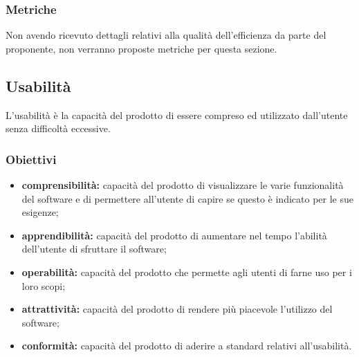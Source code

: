 \subsubsection{Metriche}
Non avendo ricevuto dettagli relativi alla qualità dell'efficienza da parte del proponente, non verranno proposte metriche per questa sezione.

\subsection{Usabilità}
L'usabilità è la capacità del prodotto di essere compreso ed utilizzato dall'utente senza difficoltà eccessive.

\subsubsection{Obiettivi}
\begin{itemize}
	\item \textbf{comprensibilità:} capacità del prodotto di visualizzare le varie funzionalità del software e di permettere all'utente di capire se questo è indicato per le sue esigenze;
	\item \textbf{apprendibilità:} capacità del prodotto di aumentare nel tempo l'abilità dell'utente di sfruttare il software;
	\item \textbf{operabilità:} capacità del prodotto che permette agli utenti di farne uso per i loro scopi;
	\item \textbf{attrattività:} capacità del prodotto di rendere più piacevole l'utilizzo del software;
	\item \textbf{conformità:} capacità del prodotto di aderire a standard relativi all'usabilità.
\end{itemize}

